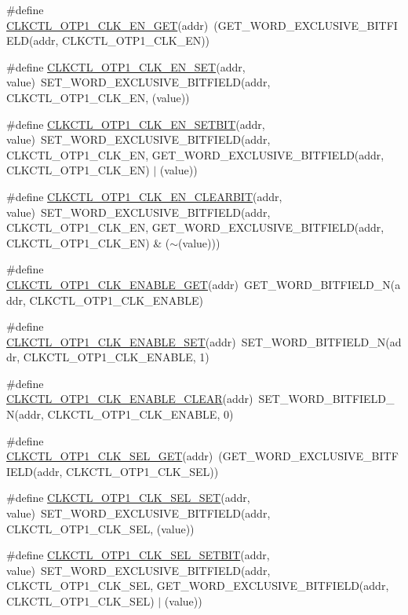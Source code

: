 \begin{DoxyCompactItemize}
\item 
\#define \hyperlink{a00544_ab033abd3da62eeb07a9868cdbad80a20}{CLKCTL\_\-OTP1\_\-CLK\_\-EN\_\-GET}(addr)~(GET\_\-WORD\_\-EXCLUSIVE\_\-BITFIELD(addr, CLKCTL\_\-OTP1\_\-CLK\_\-EN))
\item 
\#define \hyperlink{a00544_a4a37d6052a91aeef14704398a5903447}{CLKCTL\_\-OTP1\_\-CLK\_\-EN\_\-SET}(addr, value)~SET\_\-WORD\_\-EXCLUSIVE\_\-BITFIELD(addr, CLKCTL\_\-OTP1\_\-CLK\_\-EN, (value))
\item 
\#define \hyperlink{a00544_a815b1fa9446efee9232144cb97708ca0}{CLKCTL\_\-OTP1\_\-CLK\_\-EN\_\-SETBIT}(addr, value)~SET\_\-WORD\_\-EXCLUSIVE\_\-BITFIELD(addr, CLKCTL\_\-OTP1\_\-CLK\_\-EN, GET\_\-WORD\_\-EXCLUSIVE\_\-BITFIELD(addr, CLKCTL\_\-OTP1\_\-CLK\_\-EN) $|$ (value))
\item 
\#define \hyperlink{a00544_a568cf8ebdf377ac2db7d7449c7b6e3e3}{CLKCTL\_\-OTP1\_\-CLK\_\-EN\_\-CLEARBIT}(addr, value)~SET\_\-WORD\_\-EXCLUSIVE\_\-BITFIELD(addr, CLKCTL\_\-OTP1\_\-CLK\_\-EN, GET\_\-WORD\_\-EXCLUSIVE\_\-BITFIELD(addr, CLKCTL\_\-OTP1\_\-CLK\_\-EN) \& ($\sim$(value)))
\item 
\#define \hyperlink{a00544_a925130a52d0b3749afbd4912d94d5d58}{CLKCTL\_\-OTP1\_\-CLK\_\-ENABLE\_\-GET}(addr)~GET\_\-WORD\_\-BITFIELD\_\-N(addr, CLKCTL\_\-OTP1\_\-CLK\_\-ENABLE)
\item 
\#define \hyperlink{a00544_ae9cd86d92df8e628006c6f6e4c6ebbfb}{CLKCTL\_\-OTP1\_\-CLK\_\-ENABLE\_\-SET}(addr)~SET\_\-WORD\_\-BITFIELD\_\-N(addr, CLKCTL\_\-OTP1\_\-CLK\_\-ENABLE, 1)
\item 
\#define \hyperlink{a00544_a90994e12962d5dd95ed7f80ce3894b58}{CLKCTL\_\-OTP1\_\-CLK\_\-ENABLE\_\-CLEAR}(addr)~SET\_\-WORD\_\-BITFIELD\_\-N(addr, CLKCTL\_\-OTP1\_\-CLK\_\-ENABLE, 0)
\item 
\#define \hyperlink{a00544_aee63c089c36fd0652bdaec1506e90793}{CLKCTL\_\-OTP1\_\-CLK\_\-SEL\_\-GET}(addr)~(GET\_\-WORD\_\-EXCLUSIVE\_\-BITFIELD(addr, CLKCTL\_\-OTP1\_\-CLK\_\-SEL))
\item 
\#define \hyperlink{a00544_ac09efe0e8c2ded559b597f2df9f3c294}{CLKCTL\_\-OTP1\_\-CLK\_\-SEL\_\-SET}(addr, value)~SET\_\-WORD\_\-EXCLUSIVE\_\-BITFIELD(addr, CLKCTL\_\-OTP1\_\-CLK\_\-SEL, (value))
\item 
\#define \hyperlink{a00544_abdf2c816bc4852782b4f95745ee6d80a}{CLKCTL\_\-OTP1\_\-CLK\_\-SEL\_\-SETBIT}(addr, value)~SET\_\-WORD\_\-EXCLUSIVE\_\-BITFIELD(addr, CLKCTL\_\-OTP1\_\-CLK\_\-SEL, GET\_\-WORD\_\-EXCLUSIVE\_\-BITFIELD(addr, CLKCTL\_\-OTP1\_\-CLK\_\-SEL) $|$ (value))
\item 

\end{DoxyCompactItemize}
